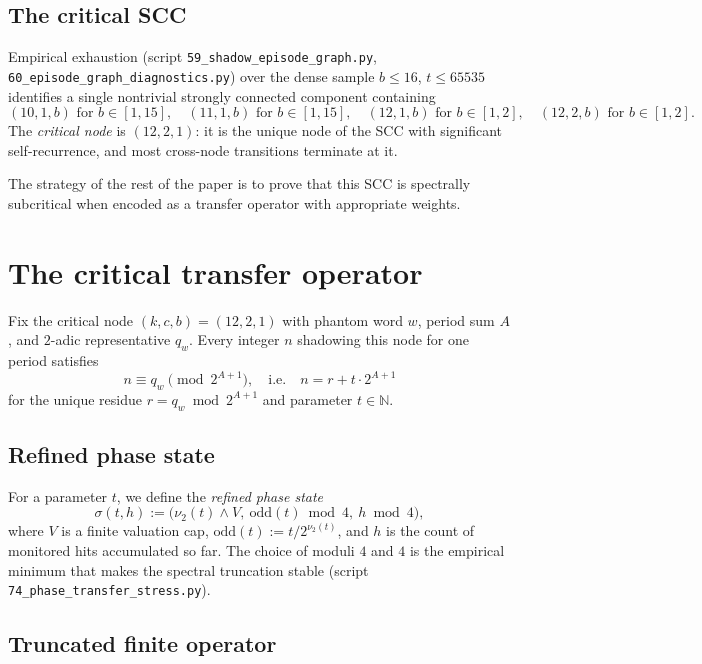 \documentclass[11pt,a4paper]{article}
\theoremstyle{definition}
\newcommand{\N}{\mathbb{N}}
\begin{document}
\subsection{The critical SCC}

Empirical exhaustion (script \verb|59_shadow_episode_graph.py|,
\verb|60_episode_graph_diagnostics.py|) over the dense sample
$b \le 16$, $t \le 65535$ identifies a single nontrivial strongly
connected component containing
\[
(10,1,b) \text{ for } b \in [1,15], \quad
(11,1,b) \text{ for } b \in [1,15], \quad
(12,1,b) \text{ for } b \in [1,2], \quad
(12,2,b) \text{ for } b \in [1,2].
\]
The \emph{critical node} is $(12, 2, 1)$: it is the unique node of
the SCC with significant self-recurrence, and most cross-node
transitions terminate at it.

The strategy of the rest of the paper is to prove that this SCC is
spectrally subcritical when encoded as a transfer operator with
appropriate weights.

\section{The critical transfer operator}
\label{sec:operator}

Fix the critical node $(k,c,b) = (12,2,1)$ with phantom word $w$,
period sum $A$, and $2$-adic representative $q_w$. Every integer $n$
shadowing this node for one period satisfies
\[
n \equiv q_w \pmod{2^{A+1}},
\quad\text{i.e.}\quad
n = r + t \cdot 2^{A+1}
\]
for the unique residue $r = q_w \bmod 2^{A+1}$ and parameter
$t \in \N$.

\subsection{Refined phase state}

For a parameter $t$, we define the \emph{refined phase state}
\[
\sigma(t, h) := \bigl(\nu_2(t)\wedge V,\ \mathrm{odd}(t) \bmod 4,\ h \bmod 4\bigr),
\]
where $V$ is a finite valuation cap, $\mathrm{odd}(t) := t / 2^{\nu_2(t)}$,
and $h$ is the count of monitored hits accumulated so far. The
choice of moduli $4$ and $4$ is the empirical minimum that makes
the spectral truncation stable (script
\verb|74_phase_transfer_stress.py|).

\subsection{Truncated finite operator}
\end{document}
